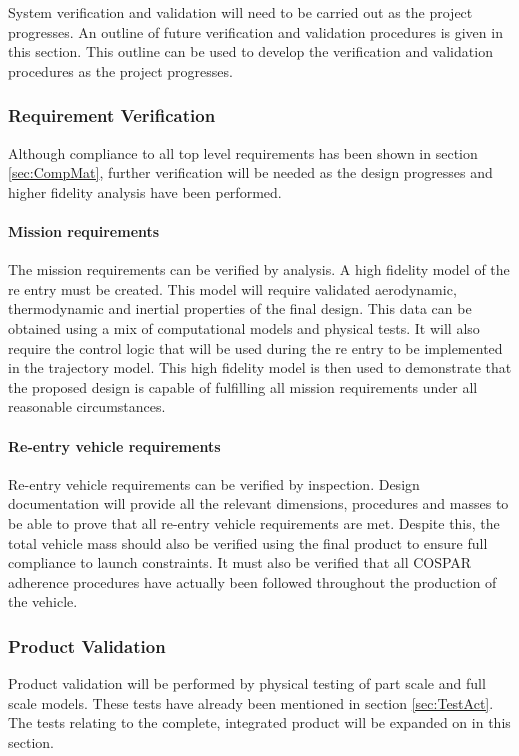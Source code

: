 System verification and validation will need to be carried out as the project progresses. An outline of future verification and validation procedures is given in this section. This outline can be used to develop the verification and validation procedures as the project progresses. 

\subsubsection{Requirement Verification}
\label{sec:ReqVer}
Although compliance to all top level requirements has been shown in section \ref{sec:CompMat}, further verification will be needed as the design progresses and higher fidelity analysis have been performed. 

\paragraph{Mission requirements}
The mission requirements can be verified by analysis. A high fidelity model of the re entry must be created. This model will require validated aerodynamic, thermodynamic and inertial properties of the final design. This data can be obtained using a mix of computational models and physical tests. It will also require the control logic that will be used during the re entry to be implemented in the trajectory model. This high fidelity model is then used to demonstrate that the proposed design is capable of fulfilling all mission requirements under all reasonable circumstances. 

\paragraph{Re-entry vehicle requirements}
Re-entry vehicle requirements can be verified by inspection. Design documentation will provide all the relevant dimensions, procedures and masses to be able to prove that all re-entry vehicle requirements are met. Despite this, the total vehicle mass should also be verified using the final product to ensure full compliance to launch constraints. It must also be verified that all COSPAR adherence procedures have actually been followed throughout the production of the vehicle. 

\subsubsection{Product Validation}
Product validation will be performed by physical testing of part scale and full scale models. These tests have already been mentioned in section \ref{sec:TestAct}. The tests relating to the complete, integrated product will be expanded on in this section. 




